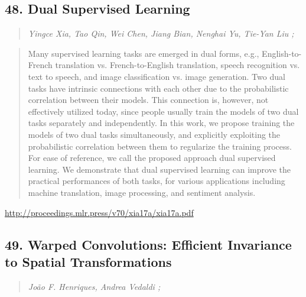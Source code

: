 \documentclass{article}
\begin{document}
\subsection{48. Dual Supervised Learning}

\begin{quote}
\footnotesize{\textit{Yingce Xia, Tao Qin, Wei Chen, Jiang Bian, Nenghai Yu, Tie-Yan Liu ;}}

\end{quote}

\begin{quote}
    Many supervised learning tasks are emerged in dual forms, e.g., English-to-French translation vs. French-to-English translation, speech recognition vs. text to speech, and image classification vs. image generation. Two dual tasks have intrinsic connections with each other due to the probabilistic correlation between their models. This connection is, however, not effectively utilized today, since people usually train the models of two dual tasks separately and independently. In this work, we propose training the models of two dual tasks simultaneously, and explicitly exploiting the probabilistic correlation between them to regularize the training process. For ease of reference, we call the proposed approach dual supervised learning. We demonstrate that dual supervised learning can improve the practical performances of both tasks, for various applications including machine translation, image processing, and sentiment analysis.  
\end{quote}

\href{http://proceedings.mlr.press/v70/xia17a/xia17a.pdf}{http://proceedings.mlr.press/v70/xia17a/xia17a.pdf}

\subsection{49. Warped Convolutions: Efficient Invariance to Spatial Transformations}

\begin{quote}
\footnotesize{\textit{João F. Henriques, Andrea Vedaldi ;}}

\end{quote}
\end{document}
